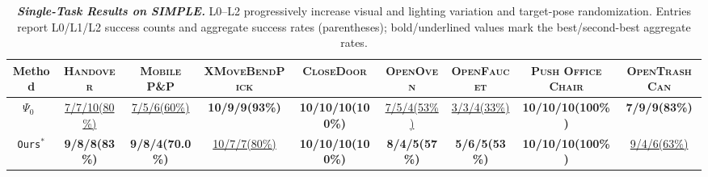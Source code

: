 \begin{table}[H]
  \caption{\textbf{\textit{Single-Task Results on SIMPLE.}} L0--L2 progressively increase visual and lighting variation and target-pose randomization. Entries report L0/L1/L2 success counts and aggregate success rates (parentheses); bold/underlined values mark the best/second-best aggregate rates.}
  \label{table:simple_main_results}
  \centering
  \setlength{\tabcolsep}{0pt}
  \renewcommand{\arraystretch}{1.08}
  \fontsize{6.2}{7}\selectfont
  \newcommand{\taskheader}[1]{{\fontsize{5.55}{6.2}\selectfont\textbf{\textsc{\hspace{2.2pt}#1\hspace{2.2pt}}}}}
  \newcommand{\resultentry}[2]{{\fontsize{5.2}{6}\selectfont\hspace{2.2pt}#1\;(#2)\hspace{2.2pt}}}
  \newcommand{\bestentry}[2]{{\fontsize{5.2}{6}\selectfont\textbf{\hspace{2.2pt}#1\;(#2)\hspace{2.2pt}}}}
  \newcommand{\secondentry}[2]{{\fontsize{5.2}{6}\selectfont\hspace{2.2pt}\underline{#1\;(#2)}\hspace{2.2pt}}}

  \begin{adjustbox}{width=\textwidth}
  \begin{tabular}{@{}c*{8}{c}@{}}
    \toprule
    {\fontsize{5.55}{6.2}\selectfont\textbf{Method}}
    & \taskheader{Handover}
    & \taskheader{Mobile P\&P}
    & \taskheader{XMoveBendPick}
    & \taskheader{CloseDoor}
    & \taskheader{OpenOven}
    & \taskheader{OpenFaucet}
    & \taskheader{Push Office Chair}
    & \taskheader{OpenTrashCan} \\
    \midrule

    $\Psi_0$~\cite{psi0}
    & \secondentry{7/7/10}{80\%}
    & \secondentry{7/5/6}{60\%}
    & \bestentry{10/9/9}{93\%}
    & \bestentry{10/10/10}{100\%}
    & \secondentry{7/5/4}{53\%}
    & \secondentry{3/3/4}{33\%}
    & \bestentry{10/10/10}{100\%}
    & \bestentry{7/9/9}{83\%} \\

    \rowcolor{hclbrown!15!white}
    \texttt{Ours}$^{*}$
    & \bestentry{9/8/8}{83\%}
    & \bestentry{9/8/4}{70.0\%}
    & \secondentry{10/7/7}{80\%}
    & \bestentry{10/10/10}{100\%}
    & \bestentry{8/4/5}{57\%}
    & \bestentry{5/6/5}{53\%}
    & \bestentry{10/10/10}{100\%}
    & \secondentry{9/4/6}{63\%} \\

    \bottomrule
  \end{tabular}
  \end{adjustbox}
\end{table}
